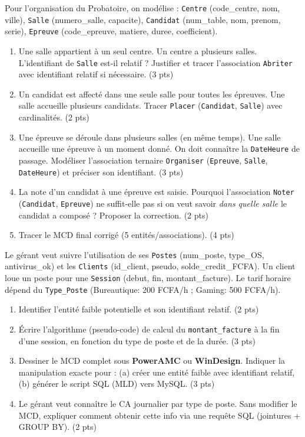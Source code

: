 \documentclass[11pt]{article}
\begin{document}
\begin{exercice}
Pour l'organisation du Probatoire, on modélise : \texttt{Centre} (code\_centre, nom, ville), \texttt{Salle} (numero\_salle, capacite), \texttt{Candidat} (num\_table, nom, prenom, serie), \texttt{Epreuve} (code\_epreuve, matiere, duree, coefficient).
\begin{enumerate}
    \item Une salle appartient à un seul centre. Un centre a plusieurs salles. L'identifiant de \texttt{Salle} est-il relatif ? Justifier et tracer l'association \texttt{Abriter} avec identifiant relatif si nécessaire. (3 pts)
    \item Un candidat est affecté dans une seule salle pour toutes les épreuves. Une salle accueille plusieurs candidats. Tracer \texttt{Placer} (\texttt{Candidat}, \texttt{Salle}) avec cardinalités. (2 pts)
    \item Une épreuve se déroule dans plusieurs salles (en même temps). Une salle accueille une épreuve à un moment donné. On doit connaître la \texttt{DateHeure} de passage. Modéliser l'association ternaire \texttt{Organiser} (\texttt{Epreuve}, \texttt{Salle}, \texttt{DateHeure}) et préciser son identifiant. (3 pts)
    \item La note d'un candidat à une épreuve est saisie. Pourquoi l'association \texttt{Noter} (\texttt{Candidat}, \texttt{Epreuve}) ne suffit-elle pas si on veut savoir \textit{dans quelle salle} le candidat a composé ? Proposer la correction. (2 pts)
    \item Tracer le MCD final corrigé (5 entités/associations). (4 pts)
\end{enumerate}
\end{exercice}

\begin{exercice}
Le gérant veut suivre l'utilisation de ses \texttt{Postes} (num\_poste, type\_OS, antivirus\_ok) et les \texttt{Clients} (id\_client, pseudo, solde\_credit\_FCFA). Un client loue un poste pour une \texttt{Session} (debut, fin, montant\_facture). Le tarif horaire dépend du \texttt{Type\_Poste} (Bureautique: 200 FCFA/h ; Gaming: 500 FCFA/h).
\begin{enumerate}
    \item Identifier l'entité faible potentielle et son identifiant relatif. (2 pts)
    \item Écrire l'algorithme (pseudo-code) de calcul du \texttt{montant\_facture} à la fin d'une session, en fonction du type de poste et de la durée. (3 pts)
    \item Dessiner le MCD complet sous \textbf{PowerAMC} ou \textbf{WinDesign}. Indiquer la manipulation exacte pour : (a) créer une entité faible avec identifiant relatif, (b) générer le script SQL (MLD) vers MySQL. (3 pts)
    \item Le gérant veut connaître le CA journalier par type de poste. Sans modifier le MCD, expliquer comment obtenir cette info via une requête SQL (jointures + GROUP BY). (2 pts)
\end{enumerate}
\end{exercice}
\end{document}
